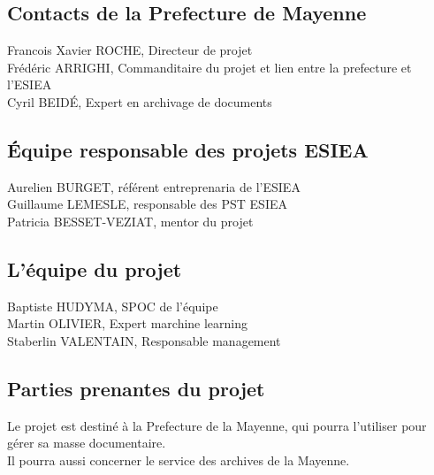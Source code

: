 
\subsection {Contacts de la Prefecture de Mayenne}
Francois Xavier ROCHE, Directeur de projet \\
Frédéric ARRIGHI, Commanditaire du projet et lien entre la prefecture et l'ESIEA \\
Cyril BEIDÉ, Expert en archivage de documents \\



\subsection {Équipe responsable des projets ESIEA}
Aurelien BURGET, référent entreprenaria de l'ESIEA \\
Guillaume LEMESLE, responsable des PST ESIEA \\
Patricia BESSET-VEZIAT, mentor du projet \\



\subsection {L'équipe du projet}
Baptiste HUDYMA, SPOC de l'équipe \\
Martin OLIVIER, Expert marchine learning \\
Staberlin VALENTAIN, Responsable management \\


\subsection {Parties prenantes du projet}
Le projet est destiné à la Prefecture de la Mayenne, qui pourra l'utiliser pour gérer sa masse documentaire. \\
Il pourra aussi concerner le service des archives de la Mayenne. \\

